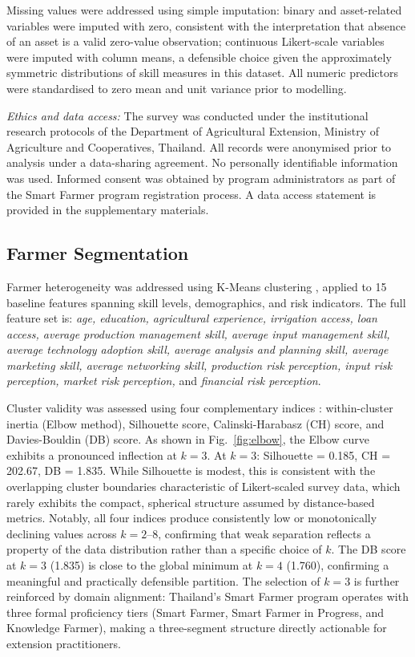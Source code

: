 \documentclass[3p,twocolumn,authoryear]{elsarticle}
\begin{document}
Missing values were addressed using simple imputation: binary and
asset-related variables were imputed with zero, consistent with the
interpretation that absence of an asset is a valid zero-value
observation; continuous Likert-scale variables were imputed with column
means, a defensible choice given the approximately symmetric
distributions of skill measures in this dataset.
All numeric predictors were standardised to zero mean and unit variance
prior to modelling.

\textit{Ethics and data access:} The survey was conducted under the
institutional research protocols of the Department of Agricultural
Extension, Ministry of Agriculture and Cooperatives, Thailand.
All records were anonymised prior to analysis under a data-sharing
agreement.
No personally identifiable information was used.
Informed consent was obtained by program administrators as part of the
Smart Farmer program registration process.
A data access statement is provided in the supplementary materials.

\subsection{Farmer Segmentation}

Farmer heterogeneity was addressed using K-Means clustering
\citep{macqueen1967}, applied to 15 baseline features spanning skill
levels, demographics, and risk indicators.
The full feature set is: \textit{age, education, agricultural experience,
irrigation access, loan access, average production management skill,
average input management skill, average technology adoption skill,
average analysis and planning skill, average marketing skill, average
networking skill, production risk perception, input risk perception,
market risk perception,} and \textit{financial risk perception}.

Cluster validity was assessed using four complementary indices
\citep{rouseeuw1987}: within-cluster inertia (Elbow method), Silhouette
score, Calinski-Harabasz (CH) score, and Davies-Bouldin (DB) score.
As shown in Fig.~\ref{fig:elbow}, the Elbow curve exhibits a pronounced
inflection at $k = 3$.
At $k = 3$: Silhouette = 0.185, CH = 202.67, DB = 1.835.
While Silhouette is modest, this is consistent with the overlapping
cluster boundaries characteristic of Likert-scaled survey data, which
rarely exhibits the compact, spherical structure assumed by
distance-based metrics.
Notably, all four indices produce consistently low or monotonically
declining values across $k = 2$--$8$, confirming that weak separation
reflects a property of the data distribution rather than a specific
choice of $k$.
The DB score at $k = 3$ (1.835) is close to the global minimum at
$k = 4$ (1.760), confirming a meaningful and practically defensible
partition.
The selection of $k = 3$ is further reinforced by domain alignment:
Thailand's Smart Farmer program operates with three formal proficiency
tiers (Smart Farmer, Smart Farmer in Progress, and Knowledge Farmer),
making a three-segment structure directly actionable for extension
practitioners.
\end{document}
